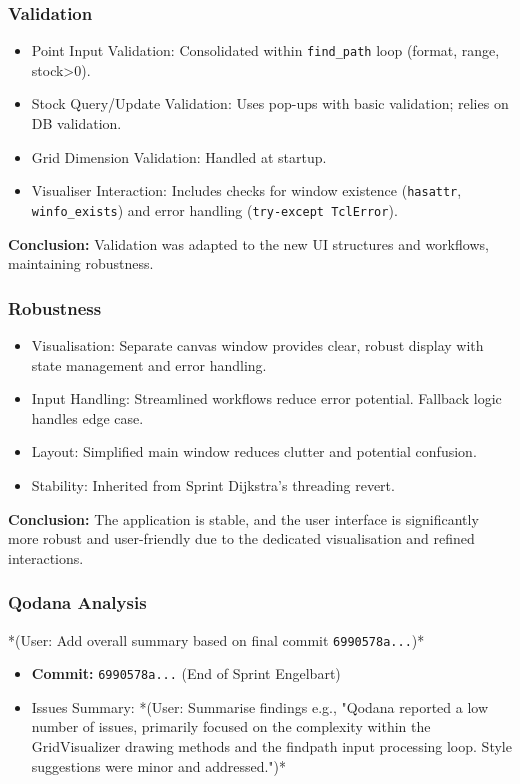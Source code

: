 \subsubsection{Validation}
\begin{itemize}
	\item Point Input Validation: Consolidated within \verb|find_path| loop (format, range, stock>0).
	\item Stock Query/Update Validation: Uses pop-ups with basic validation; relies on DB validation.
	\item Grid Dimension Validation: Handled at startup.
	\item Visualiser Interaction: Includes checks for window existence (\verb|hasattr|, \verb|winfo_exists|) and error handling (\verb|try-except TclError|).
\end{itemize}
\textbf{Conclusion:} Validation was adapted to the new UI structures and workflows, maintaining robustness.

\subsubsection{Robustness}
\begin{itemize}
	\item Visualisation: Separate canvas window provides clear, robust display with state management and error handling.
	\item Input Handling: Streamlined workflows reduce error potential. Fallback logic handles edge case.
	\item Layout: Simplified main window reduces clutter and potential confusion.
	\item Stability: Inherited from Sprint Dijkstra's threading revert.
\end{itemize}
\textbf{Conclusion:} The application is stable, and the user interface is significantly more robust and user-friendly due to the dedicated visualisation and refined interactions.

\subsubsection{Qodana Analysis}
*(User: Add overall summary based on final commit \verb|6990578a...|)*
\begin{itemize}
	\item \textbf{Commit:} \verb|6990578a...| (End of Sprint Engelbart)
	\item Issues Summary: *(User: Summarise findings e.g., "Qodana reported a low number of issues, primarily focused on the complexity within the GridVisualizer drawing methods and the findpath input processing loop. Style suggestions were minor and addressed.")*
\end{itemize}

